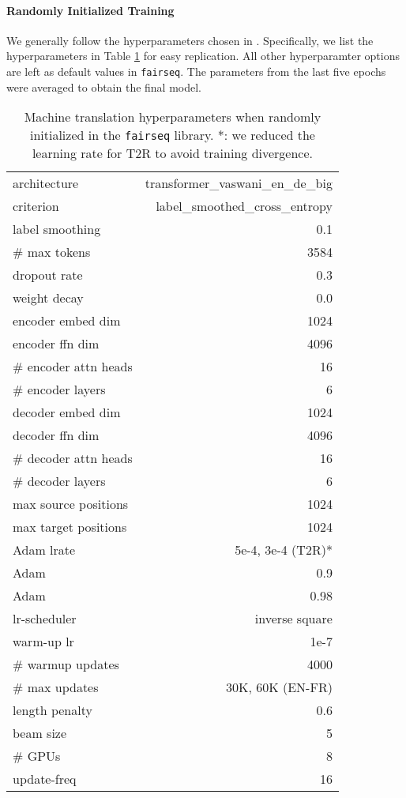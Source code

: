 \documentclass[11pt,a4paper]{article}
\newcommand{\TRNN}{T2R\xspace}
\begin{document}
\paragraph{Randomly Initialized Training}
We generally follow the hyperparameters chosen in \citet{Vaswani2017AttentionIA, Ott2018ScalingNM}.
Specifically, we list the hyperparameters in Table \ref{tab:mt-hyp} for easy replication. All other hyperparamter options are left as default values in \texttt{fairseq}.
The parameters from the last five epochs were averaged to obtain the final model.


\begin{table}[h]
\small
\centering
\begin{tabular}{ |l r|}
\hline
architecture & transformer\_vaswani\_en\_de\_big\\
criterion & label\_smoothed\_cross\_entropy\\
label smoothing & 0.1\\
\# max tokens & 3584 \\
dropout rate & 0.3\\
weight decay & 0.0 \\
encoder embed dim  & 1024\\
encoder ffn dim  & 4096\\
\# encoder attn heads & 16\\
\# encoder layers & 6 \\
decoder embed dim  & 1024\\
decoder ffn dim  & 4096\\
\# decoder attn heads & 16\\
\# decoder layers & 6 \\
max source positions & 1024 \\
max target positions & 1024 \\
Adam lrate& 5e-4, 3e-4 (\TRNN)*\\
Adam & 0.9\\
Adam & 0.98\\
lr-scheduler &  inverse square \\
warm-up lr & 1e-7 \\
\# warmup updates & 4000 \\
\# max updates &  30K, 60K (EN-FR) \\
length penalty & 0.6\\
beam size & 5\\
\# GPUs & 8 \\
update-freq & 16\\
\hline
\end{tabular}
\caption{Machine translation hyperparameters when randomly initialized in the \texttt{fairseq} library. *: we reduced the learning rate for \TRNN to avoid training divergence.}
\label{tab:mt-hyp}
\end{table}
\end{document}
